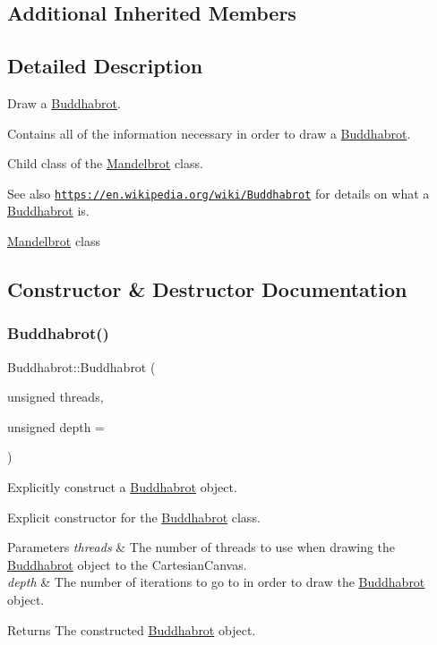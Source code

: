 \subsection*{Additional Inherited Members}


\subsection{Detailed Description}
Draw a \hyperlink{class_buddhabrot}{Buddhabrot}. 

Contains all of the information necessary in order to draw a \hyperlink{class_buddhabrot}{Buddhabrot}.

Child class of the \hyperlink{class_mandelbrot}{Mandelbrot} class. \begin{DoxySeeAlso}{See also}
\href{https://en.wikipedia.org/wiki/Buddhabrot}{\tt https\+://en.\+wikipedia.\+org/wiki/\+Buddhabrot} for details on what a \hyperlink{class_buddhabrot}{Buddhabrot} is. 

\hyperlink{class_mandelbrot}{Mandelbrot} class 
\end{DoxySeeAlso}


\subsection{Constructor \& Destructor Documentation}
\mbox{\label{class_buddhabrot_a3785536aee5b43aac307c8c737d0a1bb}} 
\subsubsection{\texorpdfstring{Buddhabrot()}{Buddhabrot()}}
{\footnotesize\ttfamily Buddhabrot\+::\+Buddhabrot (\begin{DoxyParamCaption}\item[{unsigned}]{threads,  }\item[{unsigned}]{depth = {} }\end{DoxyParamCaption})}



Explicitly construct a \hyperlink{class_buddhabrot}{Buddhabrot} object. 

Explicit constructor for the \hyperlink{class_buddhabrot}{Buddhabrot} class. 
\begin{DoxyParams}{Parameters}
{\em threads} & The number of threads to use when drawing the \hyperlink{class_buddhabrot}{Buddhabrot} object to the Cartesian\+Canvas. \\
\hline
{\em depth} & The number of iterations to go to in order to draw the \hyperlink{class_buddhabrot}{Buddhabrot} object. \\
\hline
\end{DoxyParams}
\begin{DoxyReturn}{Returns}
The constructed \hyperlink{class_buddhabrot}{Buddhabrot} object. 
\end{DoxyReturn}
\mbox{\label{class_buddhabrot_ad54bede3c44cc5d9181bd6a28feb0dbd}} 
